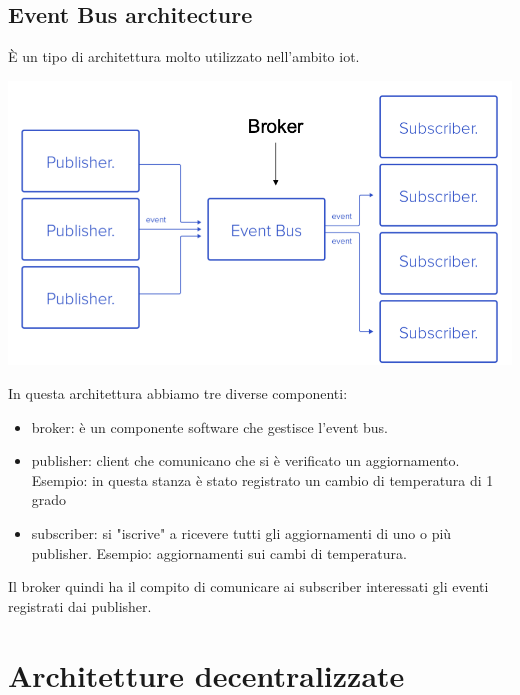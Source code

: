 \subsection{Event Bus architecture}
È un tipo di architettura molto utilizzato nell'ambito iot.
    \begin{center}
        \includegraphics[width = .5\textwidth]{images/lezione2/eventbus.png}
    \end{center}
In questa architettura abbiamo tre diverse componenti:
\begin{itemize}
    \item broker: è un componente software che gestisce l'event bus.
    \item publisher: client che comunicano che si è verificato un aggiornamento. Esempio: in questa stanza è stato registrato un cambio di temperatura di 1 grado
    \item subscriber: si "iscrive" a ricevere tutti gli aggiornamenti di uno o più publisher. Esempio: aggiornamenti sui cambi di temperatura.
\end{itemize}
Il broker quindi ha il compito di comunicare ai subscriber interessati gli eventi registrati dai publisher.

\section{Architetture decentralizzate}
